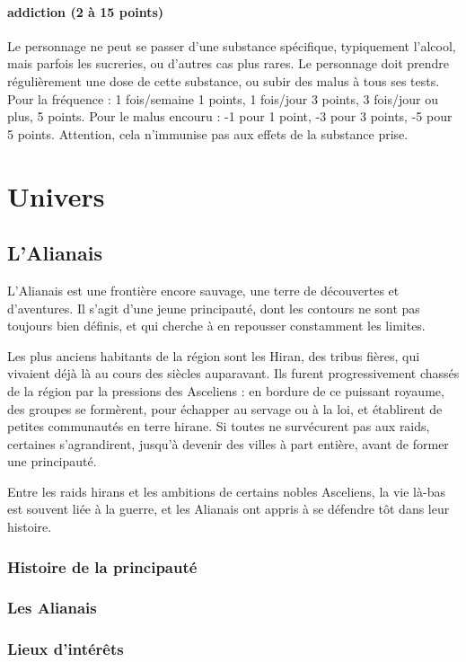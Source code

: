\documentclass[10pt,a4paper,twocolumn]{book}
\begin{document}
\subsubsection{addiction (2 à 15 points) }
Le personnage ne peut se passer d'une substance spécifique, typiquement l'alcool, mais parfois les sucreries, ou d'autres cas plus rares. Le personnage doit prendre régulièrement une dose de cette substance, ou subir des malus à tous ses tests. Pour la fréquence : 1 fois/semaine 1 points, 1 fois/jour 3 points, 3 fois/jour ou plus, 5 points. Pour le malus encouru : -1 pour 1 point, -3 pour 3 points, -5 pour 5 points. Attention, cela n'immunise pas aux effets de la substance prise.

\chapter{Univers}

\section{L'Alianais}
L'Alianais est une frontière encore sauvage, une terre de découvertes et d'aventures. Il s'agit d'une jeune principauté, dont les contours ne sont pas toujours bien définis, et qui cherche à en repousser constamment les limites.

Les plus anciens habitants de la région sont les Hiran, des tribus fières, qui vivaient déjà là au cours des siècles auparavant. Ils furent progressivement chassés de la région par la pressions des Asceliens : en bordure de ce puissant royaume, des groupes se formèrent, pour échapper au servage ou à la loi, et établirent de petites communautés en terre hirane. Si toutes ne survécurent pas aux raids, certaines s'agrandirent, jusqu'à devenir des villes à part entière, avant de former une principauté.

Entre les raids hirans et les ambitions de certains nobles Asceliens, la vie là-bas est souvent liée à la guerre, et les Alianais ont appris à se défendre tôt dans leur histoire.
\subsection{Histoire de la principauté}
\subsection{Les Alianais}
\subsection{Lieux d'intérêts}
\end{document}
